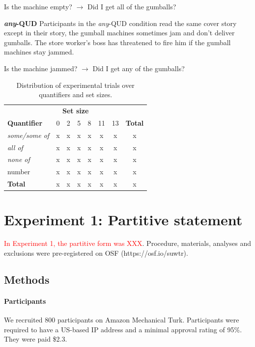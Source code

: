 \documentclass[10pt,letterpaper]{article}
\begin{document}
\begin{center}Is the machine empty? $\rightarrow$ Did I get all of the gumballs?\end{center}

\textbf{\textit{any}-QUD} Participants in the \textit{any}-QUD condition read the same cover story except in their story, the gumball machines sometimes jam and don't deliver gumballs. The store worker's boss has threatened to fire him if the gumball machines stay jammed.

\begin{center}Is the machine jammed? $\rightarrow$ Did I get any of the gumballs?\end{center}

  \begin{table}
      \begin{tabular}{lccccccc}
      \toprule
      \multicolumn{8}{c}{\textbf{Set size}} \\
      \textbf{Quantifier} & 0 & 2 & 5 & 8 & 11 & 13 & \multicolumn{1}{l}{\textbf{Total}} \\
      \midrule
      \textit{some/some of} & x & x & x & x & x & x & x \\
      \textit{all of} & x & x & x & x & x & x & x \\
      \textit{none of} & x & x & x & x & x & x & x \\
      number & x & x & x & x & x & x & x \\
      \bottomrule
      \textbf{Total} & x & x & x & x & x & x & x
      \end{tabular}
    \caption{Distribution of experimental trials over quantifiers and set sizes.\label{tab:stimuli}}
  \end{table}

\section{Experiment 1: Partitive statement}

\textcolor{red}{In Experiment 1, the partitive form was XXX}.
Procedure, materials, analyses and exclusions were pre-registered on OSF (https://osf.io/suwtr).

\subsection{Methods}

\paragraph{Participants}
We recruited 800 participants on Amazon Mechanical Turk. Participants were required to have a US-based IP address and a minimal approval rating of 
95\%. They were paid \$2.3.
\end{document}
